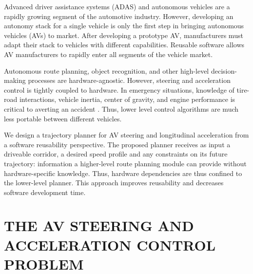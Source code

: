 \documentclass[letterpaper, 10 pt, conference]{ieeeconf}  %
\begin{document}
Advanced driver assistance systems (ADAS) and autonomous vehicles are a rapidly growing segment of the automotive industry. However,
developing an autonomy stack for a single vehicle is only the first step in bringing autonomous vehicles (AVs) to market. After developing a prototype AV, manufacturers must adapt their stack to vehicles with different capabilities. %
Reusable software allows AV manufacturers to rapidly enter all segments of the vehicle market.

Autonomous route planning, object recognition, and other high-level decision-making processes are hardware-agnostic. However, steering and acceleration control is tightly coupled to hardware.
In emergency situations, knowledge of tire-road interactions, vehicle inertia, center of gravity, and engine performance is critical to averting an accident \cite{beal}. Thus, lower level control algorithms are much less portable between different vehicles.

We design a trajectory planner for AV steering and longitudinal acceleration from a software reusability perspective. The proposed planner receives as input a driveable corridor, a desired speed profile and any constraints on its future trajectory: information a higher-level route planning module can provide without hardware-specific knowledge. Thus, hardware dependencies are thus confined to the lower-level planner. This approach improves reusability and decreases software development time.


\section{THE AV STEERING AND ACCELERATION CONTROL PROBLEM}
\end{document}
